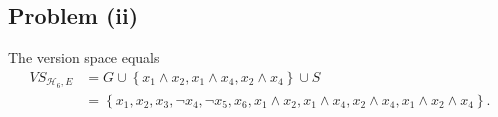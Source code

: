 \subsection*{Problem (ii)}

The version space equals
\[
\begin{aligned}\mathit{VS}_{\mathcal{H}_{6},E} & =G\cup\left\{ x_{1}\land x_{2},x_{1}\land x_{4},x_{2}\land x_{4}\right\} \cup S\\
 & =\left\{ x_{1},x_{2},x_{3},\lnot x_{4},\lnot x_{5},x_{6},x_{1}\land x_{2},x_{1}\land x_{4},x_{2}\land x_{4},x_{1}\land x_{2}\land x_{4}\right\} .
\end{aligned}
\]


